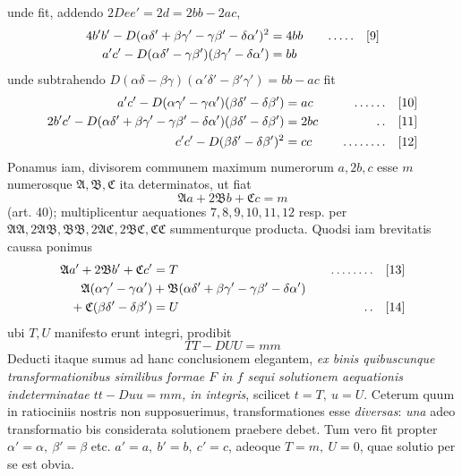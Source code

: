 unde fit, addendo \(2Dee'=2d=2bb-2ac\),
\[
\begin{aligned}
4b'b'-D(\alpha\delta'+\beta\gamma'-\gamma\beta'-\delta\alpha')^2&=4bb&\quad\mathinner{.\,.\,.\,.\,.}\quad&[9]\\
a'c'-D(\alpha\delta'-\gamma\beta')(\beta\gamma'-\delta\alpha')&=bb
\end{aligned}
\]
unde subtrahendo \(D(\alpha\delta-\beta\gamma)(\alpha'\delta'-\beta'\gamma')=bb-ac\) fit
\[
\begin{aligned}
a'c'-D(\alpha\gamma'-\gamma\alpha')(\beta\delta'-\delta\beta')&=ac&\quad\mathinner{.\,.\,.\,.\,.\,.}\quad&[10]\\
2b'c'-D(\alpha\delta'+\beta\gamma'-\gamma\beta'-\delta\alpha')(\beta\delta'-\delta\beta')&=2bc&\quad\mathinner{.\,.}\quad&[11]\\
c'c'-D(\beta\delta'-\delta\beta')^2&=cc&\quad\mathinner{.\,.\,.\,.\,.\,.\,.\,.}\quad&[12]
\end{aligned}
\]
Ponamus iam, divisorem communem maximum numerorum \(a,2b,c\) esse \(m\) numerosque \(\mathfrak{A},\mathfrak{B},\mathfrak{C}\) ita determinatos, ut fiat
\[
\mathfrak{A}a+2\mathfrak{B}b+\mathfrak{C}c=m
\]
(art. 40); multiplicentur aequationes \(7,8,9,10,11,12\) resp. per \(\mathfrak{A}\mathfrak{A},\allowbreak 2\mathfrak{A}\mathfrak{B},\allowbreak \mathfrak{B}\mathfrak{B},\allowbreak 2\mathfrak{A}\mathfrak{C},\allowbreak 2\mathfrak{B}\mathfrak{C},\allowbreak \mathfrak{C}\mathfrak{C}\) summenturque producta. Quodsi iam brevitatis caussa ponimus
\[
\begin{aligned}
\mathfrak{A}a'+2\mathfrak{B}b'+\mathfrak{C}c'&=T&\quad\mathinner{.\,.\,.\,.\,.\,.\,.\,.}\quad&[13]\\
\mathfrak{A}(\alpha\gamma'-\gamma\alpha')&+\mathfrak{B}(\alpha\delta'+\beta\gamma'-\gamma\beta'-\delta\alpha')&&\\
{}+\mathfrak{C}(\beta\delta'-\delta\beta')&=U&\quad\mathinner{.\,.}\quad&[14]
\end{aligned}
\]
ubi \(T,U\) manifesto erunt integri, prodibit
\[
TT-DUU=mm
\]
Deducti itaque sumus ad hanc conclusionem elegantem, \textit{ex binis quibuscunque transformationibus similibus formae \(F\) in \(f\) sequi solutionem aequationis indeterminatae \(tt-Duu=mm\), in integris}, scilicet \(t=T,\ u=U\). Ceterum quum in
ratiociniis nostris non supposuerimus, transformationes esse \textit{diversas}: \textit{una} adeo transformatio bis considerata solutionem praebere debet. Tum vero fit propter \(\alpha'=\alpha,\ \beta'=\beta\) etc. \(a'=a,\ b'=b,\ c'=c\), adeoque \(T=m,\ U=0\), quae solutio per se est obvia.

